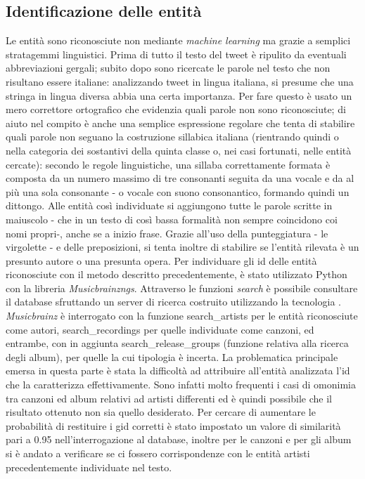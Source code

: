 \documentclass[12pt, a4paper, twocolumn]{article} %
\begin{document}
\subsection{Identificazione delle entità}
Le entità sono riconosciute non mediante \textit{machine learning} ma grazie a semplici stratagemmi linguistici.
Prima di tutto il testo del tweet è ripulito da eventuali abbreviazioni gergali; subito dopo sono ricercate le parole nel testo che non risultano essere italiane: analizzando tweet in lingua italiana, si presume che una stringa in lingua diversa abbia una certa importanza.
Per fare questo è usato un mero correttore ortografico che evidenzia quali parole non sono riconosciute; di aiuto nel compito è anche una semplice espressione regolare che tenta di stabilire quali parole non seguano la costruzione sillabica italiana (rientrando quindi o nella categoria dei sostantivi della quinta classe o, nei casi fortunati, nelle entità cercate): secondo le regole linguistiche, una sillaba correttamente formata è composta da un numero massimo di tre consonanti seguita da una vocale e da al più una sola consonante - o vocale con suono consonantico, formando quindi un dittongo.
Alle entità così individuate si aggiungono tutte le parole scritte in maiuscolo - che in un testo di così bassa formalità non sempre coincidono coi nomi propri-, anche se a inizio frase.
Grazie all'uso della punteggiatura - le virgolette - e delle preposizioni, si tenta inoltre di stabilire se l'entità rilevata è un presunto autore o una presunta opera.
Per individuare gli id delle entità riconosciute con il metodo descritto precedentemente, è stato utilizzato Python con la libreria \textit{Musicbrainzngs}.
Attraverso le funzioni \textit{search} è possibile consultare il database sfruttando un server di ricerca costruito utilizzando la tecnologia .
\textit{Musicbrainz} è interrogato con la funzione search\_artists per le entità riconosciute come autori, search\_recordings per quelle individuate come canzoni, ed entrambe, con in aggiunta search\_release\_groups (funzione relativa alla ricerca degli album), per quelle la cui tipologia è incerta.
La problematica principale emersa in questa parte è stata la difficoltà ad attribuire all’entità analizzata l’id che la caratterizza effettivamente.
Sono infatti molto frequenti i casi di omonimia tra canzoni ed album relativi ad artisti differenti ed è quindi possibile che il risultato ottenuto non sia quello desiderato.
Per cercare di aumentare le probabilità di restituire i gid corretti è stato impostato un valore di similarità pari a 0.95 nell’interrogazione al database, inoltre per le canzoni e per gli album si è andato a verificare se ci fossero corrispondenze con le entità artisti precedentemente individuate nel testo.
\end{document}
